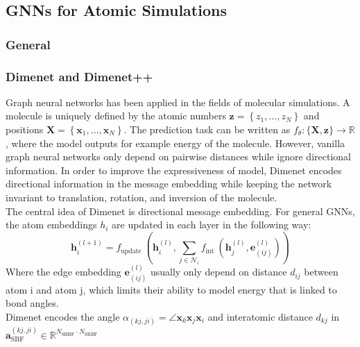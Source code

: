 \subsection{GNNs for Atomic Simulations}
\label{subsec:atomic-simulations}

\subsubsection{General}

\subsubsection{Dimenet and Dimenet++}

Graph neural networks has been applied in the fields of molecular simulations. 
A molecule is uniquely defined by the atomic numbers 
$\boldsymbol{z}=\left\{z_{1}, \ldots, z_{N}\right\}$ and positions 
$ \boldsymbol{X}=\left\{\boldsymbol{x}_{1}, \ldots, \boldsymbol{x}_{N}\right\}$. 
The prediction task can be written as 
$f_{\theta}:\{\boldsymbol{X}, \boldsymbol{z}\} \rightarrow \mathbb{R}$, 
where the model outputs for example energy of the molecule. However, vanilla graph 
neural networks only depend on pairwise distances while ignore directional information. 
In order to improve the expressiveness of model, Dimenet\cite*{DBLP:journals/corr/abs-2003-03123} 
encodes directional information in the message embedding while keeping the network invariant to 
translation, rotation, and inversion of the molecule\cite*{DBLP:journals/corr/abs-2003-03123}. \\
The central idea of Dimenet is directional message embedding. For general GNNs, the atom 
embeddings $h_i$ are updated in each layer in the following way:\\
\begin{equation}
    \boldsymbol{h}_{i}^{(l+1)}=f_{\text {update }}\left(\boldsymbol{h}_{i}^{(l)}, \sum_{j \in \mathcal{N}_{i}} f_{\text {int }}\left(\boldsymbol{h}_{j}^{(l)}, \boldsymbol{e}_{(i j)}^{(l)}\right)\right)
\end{equation}
Where the edge embedding $\boldsymbol{e}_{(i j)}^{(l)}$ usually only depend on 
distance $d_{ij}$ between atom i and atom j, which limits their ability to model 
energy that is linked to bond angles.\\
Dimenet encodes the angle 
$\alpha_{(k j, j i)}=\angle \boldsymbol{x}_{k} \boldsymbol{x}_{j} \boldsymbol{x}_{i}$ 
and interatomic distance $d_{kj}$ in 
$\boldsymbol{a}_{\mathrm{SBF}}^{(k j, j i)} \in \mathbb{R}^{N_{\mathrm{SHBF}} \cdot N_{\mathrm{SRBF}}}$ 
